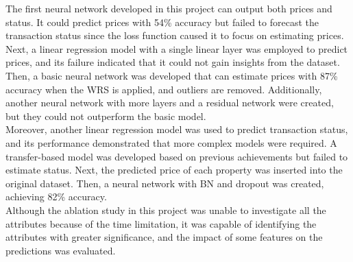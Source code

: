 \documentclass[12pt,twoside]{report}
\begin{document}
The first neural network developed in this project can output both prices and status. It could predict prices with 54\% accuracy but failed to forecast the transaction status since the loss function caused it to focus on estimating prices. Next, a linear regression model with a single linear layer was employed to predict prices, and its failure indicated that it could not gain insights from the dataset. Then, a basic neural network was developed that can estimate prices with 87\% accuracy when the WRS is applied, and outliers are removed. Additionally, another neural network with more layers and a residual network were created, but they could not outperform the basic model. 
\\

Moreover, another linear regression model was used to predict transaction status, and its performance demonstrated that more complex models were required. A transfer-based model was developed based on previous achievements but failed to estimate status. Next, the predicted price of each property was inserted into the original dataset. Then, a neural network with BN and dropout was created, achieving 82\% accuracy. 
\\

Although the ablation study in this project was unable to investigate all the attributes because of the time limitation, it was capable of identifying the attributes with greater significance, and the impact of some features on the predictions was evaluated.



\end{document}
